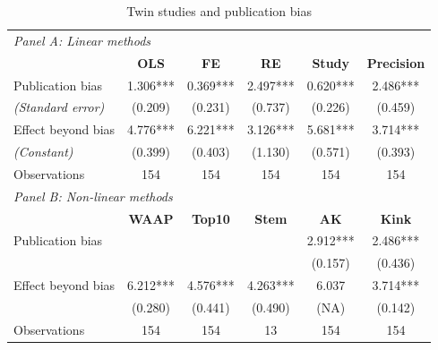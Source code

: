 \begin{table}[!htbp]
  \centering
  \small
  \singlespace
  \caption{Twin studies and publication bias}
  \label{tab:PB-Twins}
  \begin{tabular}{
      @{\hskip\tabcolsep\extracolsep}
      l*{5}{c}} %
    \toprule
    \multicolumn{6}{l}{\textit{Panel A: Linear methods}}                                            \\
    \multicolumn{1}{c}{}                  &
    \textbf{OLS}                          &
    \textbf{FE}                           &
    \textbf{RE}                           &
    \textbf{Study}                        &
    \textbf{Precision}                                                                              \\
    \midrule

    Publication bias                      & 1.306*** & 0.369*** & 2.497*** & 0.620*** & 2.486***    \\
    \emph{\hspace{0.2cm}(Standard error)} & (0.209)  & (0.231)  & (0.737)  & (0.226)  & (0.459)     \\
    \addlinespace[0.5em]
    Effect beyond bias                    & 4.776*** & 6.221*** & 3.126*** & 5.681*** & 3.714***    \\
    \emph{\hspace{0.2cm}(Constant)}       & (0.399)  & (0.403)  & (1.130)  & (0.571)  & (0.393)     \\
    \addlinespace[0.5em]
    Observations                          & 154      & 154      & 154      & 154      & 154         \\


    \midrule

    \multicolumn{6}{l}{\textit{Panel B: Non-linear methods}}                                        \\
                                          &
    \textbf{WAAP}                         &
    \textbf{Top10}                        &
    \textbf{Stem}                         &
    \textbf{AK}                           &
    \textbf{Kink}                                                                                   \\
    \midrule
    Publication bias                      &          &          &          & 2.912*** & 2.486***    \\
                                          &          &          &          & (0.157)  & (0.436)     \\
    \addlinespace[0.5em]
    Effect beyond bias                    & 6.212*** & 4.576*** & 4.263*** & 6.037    & 3.714***    \\
                                          & (0.280)  & (0.441)  & (0.490)  & (NA)     & (0.142)     \\
    \addlinespace[0.5em]
    Observations                          & 154      & 154      & 13      & 154      & 154         \\


\end{tabular}
\end{table}
